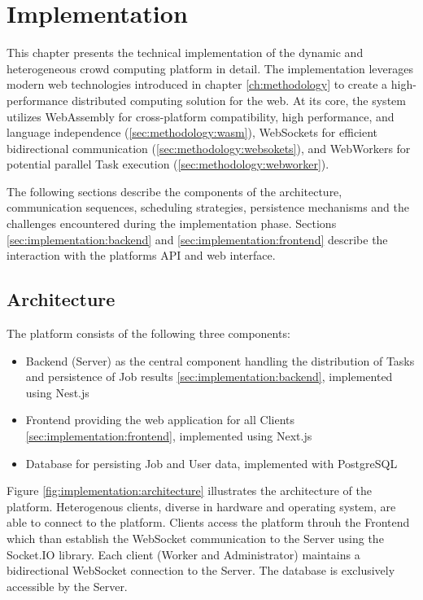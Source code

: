 \chapter{Implementation}
\label{ch:implementation}
This chapter presents the technical implementation of the dynamic and heterogeneous crowd computing platform in detail. The implementation leverages modern web technologies introduced in chapter \ref{ch:methodology} to create a high-performance distributed computing solution for the web. At its core, the system utilizes WebAssembly for cross-platform compatibility, high performance, and language independence (\ref{sec:methodology:wasm}), WebSockets for efficient bidirectional communication (\ref{sec:methodology:websokets}), and WebWorkers for potential parallel Task execution (\ref{sec:methodology:webworker}).

The following sections describe the components of the architecture, communication sequences, scheduling strategies, persistence mechanisms and the challenges encountered during the implementation phase. Sections \ref{sec:implementation:backend} and \ref{sec:implementation:frontend} describe the interaction with the platforms API and web interface.

\section{Architecture}
\label{sec:implementation:architecture}
The platform consists of the following three components:
\begin{itemize}
    \item Backend (Server) as the central component handling the distribution of Tasks and persistence of Job results \ref{sec:implementation:backend}, implemented using Nest.js \cite{methodology:nestjs}
    \item Frontend providing the web application for all Clients \ref{sec:implementation:frontend}, implemented using Next.js \cite{methodology:nextjs}
    \item Database for persisting Job and User data, implemented with PostgreSQL \cite{methodology:db}
\end{itemize}

Figure \ref{fig:implementation:architecture} illustrates the architecture of the platform. Heterogenous clients, diverse in hardware and operating system, are able to connect to the platform. Clients access the platform throuh the Frontend which than establish the WebSocket communication to the Server using the Socket.IO library. Each client (Worker and Administrator) maintains a bidirectional WebSocket connection to the Server. The database is exclusively accessible by the Server.

